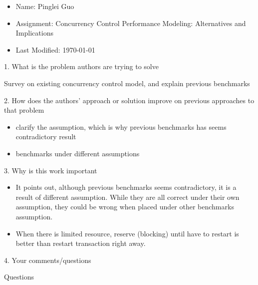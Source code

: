 \documentclass[12pt,a4paper,oneside]{article}
\begin{document}
\begin{itemize}
  \item Name: Pinglei Guo
  \item Assignment: Concurrency Control Performance Modeling: Alternatives and Implications
  \item Last Modified: \today
\end{itemize}

1. What is the problem authors are trying to solve

\medskip

Survey on existing concurrency control model, and explain previous benchmarks

\bigskip

2. How does the authors’ approach or solution improve on previous approaches to that problem

\medskip

\begin{itemize}
  \item clarify the assumption, which is why previous benchmarks has seems contradictory result
  \item benchmarks under different assumptions
\end{itemize}

\bigskip

3. Why is this work important

\medskip

\begin{itemize}
  \item It points out, although previous benchmarks seems contradictory, it is a result of different assumption.
  While they are all correct under their own assumption, they could be wrong when placed under other benchmarks assumption.
  \item When there is limited resource, reserve (blocking) until have to restart is better than restart transaction right away.
\end{itemize}

\bigskip

4. Your comments/questions

\medskip

Questions
\end{document}
